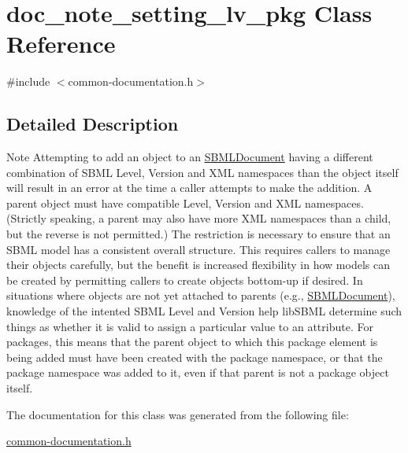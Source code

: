 \hypertarget{classdoc__note__setting__lv__pkg}{}\section{doc\+\_\+note\+\_\+setting\+\_\+lv\+\_\+pkg Class Reference}
\label{classdoc__note__setting__lv__pkg}


{\ttfamily \#include $<$common-\/documentation.\+h$>$}



\subsection{Detailed Description}
\begin{DoxyNote}{Note}
Attempting to add an object to an \hyperlink{class_s_b_m_l_document}{S\+B\+M\+L\+Document} having a different combination of S\+B\+ML Level, Version and X\+ML namespaces than the object itself will result in an error at the time a caller attempts to make the addition. A parent object must have compatible Level, Version and X\+ML namespaces. (Strictly speaking, a parent may also have more X\+ML namespaces than a child, but the reverse is not permitted.) The restriction is necessary to ensure that an S\+B\+ML model has a consistent overall structure. This requires callers to manage their objects carefully, but the benefit is increased flexibility in how models can be created by permitting callers to create objects bottom-\/up if desired. In situations where objects are not yet attached to parents (e.\+g., \hyperlink{class_s_b_m_l_document}{S\+B\+M\+L\+Document}), knowledge of the intented S\+B\+ML Level and Version help lib\+S\+B\+ML determine such things as whether it is valid to assign a particular value to an attribute. For packages, this means that the parent object to which this package element is being added must have been created with the package namespace, or that the package namespace was added to it, even if that parent is not a package object itself. 
\end{DoxyNote}


The documentation for this class was generated from the following file\+:\begin{DoxyCompactItemize}
\item 
\hyperlink{common-documentation_8h}{common-\/documentation.\+h}\end{DoxyCompactItemize}
